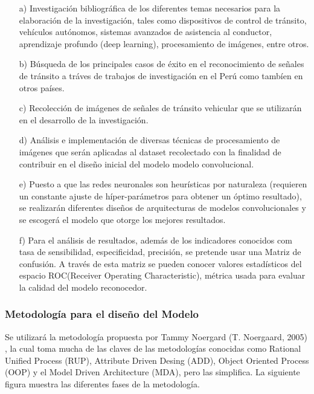 		\begin{enumerate}

		\item[a)]	Investigación bibliográfica de los diferentes temas necesarios para la elaboración de la investigación, tales como dispositivos de control de tránsito, vehículos autónomos, sistemas avanzados de asistencia al conductor, aprendizaje profundo (deep learning), procesamiento de imágenes, entre otros.
		
		\item[b)]	Búsqueda de los principales casos de éxito en el reconocimiento de señales de tránsito a tráves de trabajos de investigación en el Perú como tambíen en otros países.

		\item[c)]	Recolección de imágenes de señales de tránsito vehicular que se utilizarán en el desarrollo de la investigación.

		\item[d)]	Análisis e implementación de diversas técnicas de procesamiento de imágenes que serán aplicadas al dataset recolectado con la finalidad de contribuir en el diseño inicial del modelo modelo convolucional.

		\item[e)]	Puesto a que las redes neuronales son heurísticas por naturaleza (requieren un constante ajuste de híper-parámetros para obtener un óptimo resultado), se realizarán diferentes diseños de arquitecturas de modelos convolucionales y se escogerá el modelo que otorge los mejores resultados.
		
		\item[f)]	Para el análisis de resultados, además de los indicadores conocidos com tasa de sensibilidad, especificidad, precisión, se pretende usar una Matriz de confusión. A través de esta matriz se pueden conocer valores estadísticos del espacio ROC(Receiver Operating Characteristic), métrica usada para evaluar la calidad del modelo reconocedor.
		
		\end{enumerate}

		\subsubsection{Metodología para el diseño del Modelo}

			Se utilizará la metodología propuesta por Tammy Noergard (T. Noergaard, 2005) , la cual toma mucha de las claves de las metodologías conocidas como Rational Unified Process (RUP), Attribute Driven Desing (ADD), Object Oriented Process (OOP) y el Model Driven Architecture (MDA), pero las simplifica. La siguiente figura muestra las diferentes fases de la metodología.
			
